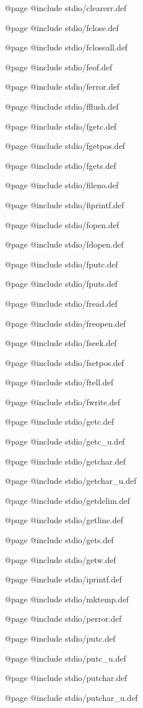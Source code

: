@page
@include stdio/clearerr.def

@page
@include stdio/fclose.def

@page
@include stdio/fcloseall.def

@page
@include stdio/feof.def

@page
@include stdio/ferror.def

@page
@include stdio/fflush.def

@page 
@include stdio/fgetc.def 

@page
@include stdio/fgetpos.def

@page 
@include stdio/fgets.def 

@page
@include stdio/fileno.def

@page
@include stdio/fiprintf.def

@page
@include stdio/fopen.def

@page
@include stdio/fdopen.def

@page
@include stdio/fputc.def

@page
@include stdio/fputs.def

@page
@include stdio/fread.def

@page
@include stdio/freopen.def

@page
@include stdio/fseek.def

@page
@include stdio/fsetpos.def

@page
@include stdio/ftell.def

@page
@include stdio/fwrite.def

@page 
@include stdio/getc.def 

@page
@include stdio/getc_u.def

@page
@include stdio/getchar.def 

@page
@include stdio/getchar_u.def

@page
@include stdio/getdelim.def

@page
@include stdio/getline.def

@page 
@include stdio/gets.def

@page 
@include stdio/getw.def 

@page
@include stdio/iprintf.def 

@page
@include stdio/mktemp.def

@page
@include stdio/perror.def

@page
@include stdio/putc.def

@page
@include stdio/putc_u.def

@page
@include stdio/putchar.def

@page
@include stdio/putchar_u.def

